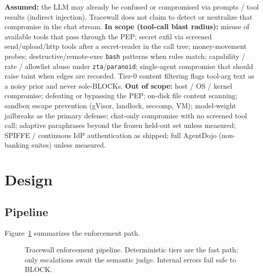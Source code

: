 \documentclass[conference]{IEEEtran}
\begin{document}
\textbf{Assumed:} the LLM may already be confused or compromised via prompts / tool results
(indirect injection). Tracewall does not claim to detect or neutralize that compromise in the
chat stream.
\textbf{In scope (tool-call blast radius):} misuse of available tools that pass through the PEP;
secret exfil via screened send/upload/http tools after a secret-reader in the call tree;
money-movement probes; destructive/remote-exec \texttt{bash} patterns when rules match;
capability / rate / allowlist abuse under \texttt{zta}/\texttt{paranoid}; single-agent
compromise that should raise taint when edges are recorded.
Tier-0 content filtering flags tool-arg text as a noisy prior and never sole-BLOCKs.
\textbf{Out of scope:} host / OS / kernel compromise; defeating or bypassing the PEP;
on-disk file content scanning; sandbox escape prevention (gVisor, landlock, seccomp, VM);
model-weight jailbreaks as the primary defense; chat-only compromise with no screened tool call;
adaptive paraphrases beyond the frozen held-out set unless measured; SPIFFE / continuous IdP
authentication as shipped; full AgentDojo (non-banking suites) unless measured.

\section{Design}

\subsection{Pipeline}
Figure~\ref{fig:arch} summarizes the enforcement path.

\begin{figure}[!t]
\centering
{}
\caption{Tracewall enforcement pipeline. Deterministic tiers are the fast path;
only escalations await the semantic judge. Internal errors fail safe to BLOCK.}
\label{fig:arch}
\end{figure}
\end{document}
